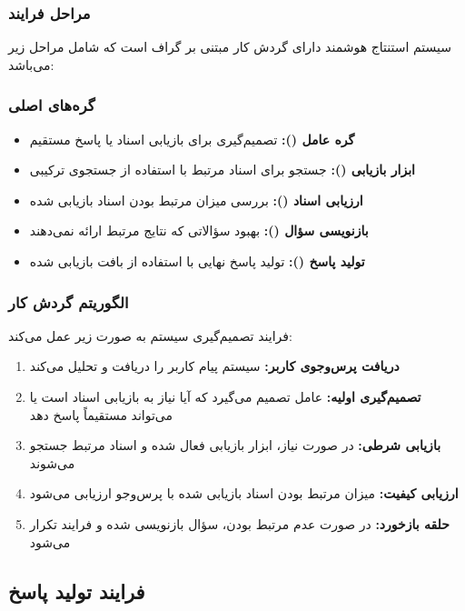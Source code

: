 \subsubsection{مراحل فرایند}
سیستم استنتاج هوشمند  دارای گردش کار مبتنی بر گراف است که شامل مراحل زیر می‌باشد:

\subsubsection*{گره‌های اصلی}
\begin{itemize}
    \item \textbf{گره عامل ():} تصمیم‌گیری برای بازیابی اسناد یا پاسخ مستقیم
    \item \textbf{ابزار بازیابی ():} جستجو برای اسناد مرتبط با استفاده از جستجوی ترکیبی
    \item \textbf{ارزیابی اسناد ():} بررسی میزان مرتبط بودن اسناد بازیابی شده
    \item \textbf{بازنویسی سؤال ():} بهبود سؤالاتی که نتایج مرتبط ارائه نمی‌دهند
    \item \textbf{تولید پاسخ ():} تولید پاسخ نهایی با استفاده از بافت بازیابی شده
\end{itemize}

\subsubsection*{الگوریتم گردش کار}
فرایند تصمیم‌گیری سیستم به صورت زیر عمل می‌کند:

\begin{enumerate}
    \item \textbf{دریافت پرس‌وجوی کاربر:} سیستم پیام کاربر را دریافت و تحلیل می‌کند
    \item \textbf{تصمیم‌گیری اولیه:} عامل تصمیم می‌گیرد که آیا نیاز به بازیابی اسناد است یا می‌تواند مستقیماً پاسخ دهد
    \item \textbf{بازیابی شرطی:} در صورت نیاز، ابزار بازیابی فعال شده و اسناد مرتبط جستجو می‌شوند
    \item \textbf{ارزیابی کیفیت:} میزان مرتبط بودن اسناد بازیابی شده با پرس‌وجو ارزیابی می‌شود
    \item \textbf{حلقه بازخورد:} در صورت عدم مرتبط بودن، سؤال بازنویسی شده و فرایند تکرار می‌شود
\end{enumerate}


\subsection{فرایند تولید پاسخ}

